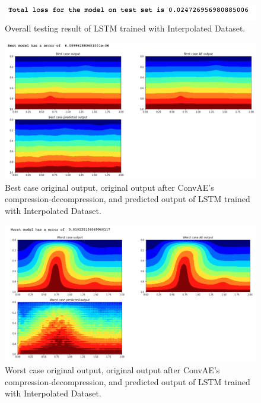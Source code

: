 \begin{figure}[H]
    \caption{Overall testing result of LSTM trained with Interpolated Dataset.}
    \includegraphics[scale=0.8]{figures/mantle_convection_images/larger_dataset_interpolated/LSTM_OverallTesting.png}
\end{figure}

\begin{figure}[H]
    \caption{Best case original output, original output after ConvAE's compression-decompression, and predicted output of LSTM trained with Interpolated Dataset.}
    \includegraphics[scale=0.5]{figures/mantle_convection_images/larger_dataset_interpolated/LSTM_Best.png}
\end{figure}

\begin{figure}[H]
    \caption{Worst case original output, original output after ConvAE's compression-decompression, and predicted output of LSTM trained with Interpolated Dataset.}
    \includegraphics[scale=0.5]{figures/mantle_convection_images/larger_dataset_interpolated/LSTM_Worst.png}
\end{figure}

